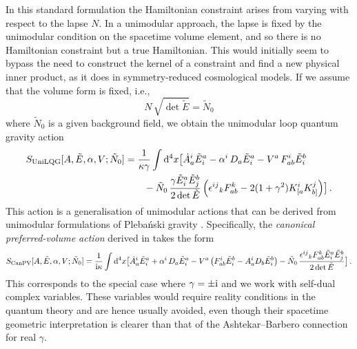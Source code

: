 \documentclass[aps,prd,11pt,showkeys,nofootinbib]{revtex4-2}
\begin{document}
In this standard formulation the Hamiltonian constraint arises from varying with respect to the lapse $N$. In a unimodular approach, the lapse is fixed by the unimodular condition on the spacetime volume element, and so there is no Hamiltonian constraint but a true Hamiltonian. This would initially seem to bypass the need to construct the kernel of a constraint and find a new physical inner product, as it does in symmetry-reduced cosmological models. If we assume that the volume form is fixed, i.e.,
\begin{equation}
N\,\sqrt{\det\tilde{E}}=\tilde{N}_0
\end{equation}
where $\tilde{N}_0$ is a given background field, we obtain the unimodular loop quantum gravity action
\begin{align}
  S_{{\rm UniLQG}}[A,\tilde{E},\alpha,V;\tilde{N}_0]&=\frac{1}{\kappa\gamma}\int {\rm d}^4 x\bigl[\dot{A}^i_a \tilde{E}_i^a - \alpha^i\,D_a\tilde{E}^a_i
 -V^a\,F^i_{ab}\tilde{E}^b_i
 \\& \qquad-\tilde{N}_0\,\frac{\gamma\tilde{E}^a_i\tilde{E}^b_j}{2\det \tilde{E}}\left({\epsilon^{ij}}_k F^k_{ab}-2(1+\gamma^2)K^i_{[a}K^j_{b]}\right)\bigr]\,. \nonumber
\end{align}
This action is a generalisation of unimodular actions that can be derived from unimodular formulations of Pleba\'nski gravity \cite{Smolin:2010iq,Gielen:2024gfb}. Specifically, the {\em canonical preferred-volume action} derived in \cite{Gielen:2024gfb} takes the form
\begin{equation}
S_{{\rm CanPV}}[A,\tilde{E},\alpha,V;\tilde{N}_0] =\frac{1}{{\rm i}\kappa}\int {\rm d}^4 x\bigl[\dot{A}^i_a\tilde{E}_i^a + \alpha^i\,D_a\tilde{E}^a_i -V^a\left(F^i_{ab}\tilde{E}^b_i-A^i_a D_b\tilde{E}^b_i\right)-\tilde{N}_0\,\frac{{\epsilon^{ij}}_k F^k_{ab}\tilde{E}^a_i\tilde{E}^b_j}{2\det\tilde{E}}\bigr]\,.
\end{equation}
This corresponds to the special case where $\gamma=\pm{\rm i}$ and we work with self-dual complex variables. These variables would require reality conditions in the quantum theory and are hence usually avoided, even though their spacetime geometric interpretation is clearer than that of the Ashtekar--Barbero connection for real $\gamma$.
\end{document}
